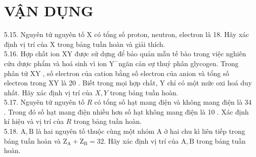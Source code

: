 \documentclass[10pt]{article}
\begin{document}
\section*{VẬN DỤNG}
5.15. Nguyên tử nguyên tố X có tổng số proton, neutron, electron là 18. Hãy xác định vị trí của X trong bảng tuần hoàn và giải thích.\\
5.16. Hợp chất ion XY được sử dựng để bảo quản mẫu tế bào trong việc nghiên cứu dược phẩm và hoá sinh vì ion $\mathrm{Y}^{-}$ngăn cản sự thuỷ phân glycogen. Trong phân tử XY , số electron của cation bằng số electron của anion và tổng số electron trong XY là 20 . Biết trong mọi hợp chất, Y chỉ có một mức oxi hoá duy nhất. Hãy xác định vị trí của $X, Y$ trong bảng tuần hoàn.\\
5.17. Nguyên tử nguyên tố $R$ có tổng số hạt mang điện và không mang điện là 34 . Trong đó số hạt mang điện nhiều hơn số hạt không mang điện là 10 . Xác định kí hiệu và vị trí của $R$ trong bảng tuần hoàn.\\
5.18. $\mathrm{A}, \mathrm{B}$ là hai nguyên tố thuộc cùng một nhóm A ở hai chu kì liên tiếp trong bảng tuần hoàn và $\mathrm{Z}_{\mathrm{A}}+\mathrm{Z}_{\mathrm{B}}=32$. Hãy xác định vị trí của $\mathrm{A}, \mathrm{B}$ trong bảng tuần hoàn.
\end{document}

